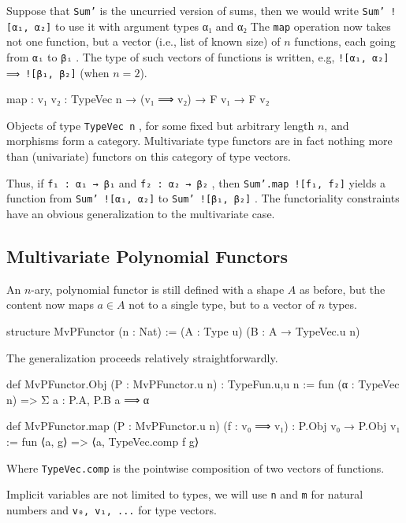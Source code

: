 \documentclass[titlepage]{report}
\newenvironment{remark}{%
\begin{framed}
\begin{trivlist}
    \item[\hskip \labelsep {\bfseries Remark:}]}%
{%
\end{trivlist}%
\end{framed}
}
\newcommand\lean[1]{{%
\def\leanmode{1}%
\small \texttt{#1}%
\undef\leanmode%
}}
\begin{document}
Suppose that \lean{Sum'} is the uncurried version of sums, then we would write \lean{Sum' ![α₁, α₂]} to use it with argument types α₁ and α₂ The \lean{map} operation now takes not one function, but a vector (i.e., list of known size) of $n$ functions, each going from \lean{αᵢ} to \lean{βᵢ}. The type of such vectors of functions is written, e.g, \lean{![α₁, α₂] ⟹ ![β₁, β₂]} (when $n=2$).

\begin{leancode}
    map : {v₁ v₂ : TypeVec n} → (v₁ ⟹ v₂) → F v₁ → F v₂
\end{leancode}
\begin{remark}
    Objects of type \lean{TypeVec n}, for some fixed but arbitrary length $n$, and morphisms  form a category. 
    Multivariate type functors are in fact nothing more than (univariate) functors on this category of type vectors.
\end{remark}

Thus, if \lean{f₁ : α₁ → β₁} and \lean{f₂ : α₂ → β₂}, then \lean{Sum'.map ![f₁, f₂]} yields a function from \lean{Sum' ![α₁, α₂]} to \lean{Sum' ![β₁, β₂]}.
The functoriality constraints have an obvious generalization to the multivariate case.

\subsection{Multivariate Polynomial Functors}
An $n$-ary, polynomial functor is still defined with a shape $A$ as before, but the content now maps $a ∈ A$ not to a single type, but to a vector of $n$ types.

\begin{leancode}
    structure MvPFunctor (n : Nat) := (A : Type u) (B : A → TypeVec.{u} n)
\end{leancode}

The generalization proceeds relatively straightforwardly.
\begin{leancode}
    def MvPFunctor.Obj (P : MvPFunctor.{u} n) : TypeFun.{u,u} n
        := fun (α : TypeVec n) => Σ a : P.A, P.B a ⟹ α

    def MvPFunctor.map  (P : MvPFunctor.{u} n) 
                        (f : v₀ ⟹ v₁) 
                            : P.Obj v₀ → P.Obj v₁ 
        := fun ⟨a, g⟩ => ⟨a, TypeVec.comp f g⟩
\end{leancode}

Where \lean{TypeVec.comp} is the pointwise composition of two vectors of functions.

\begin{remark}
    Implicit variables are not limited to types, we will use \lean{n} and \lean{m} for natural numbers and \lean{v₀, v₁, ...} for type vectors.
\end{remark}
\end{document}
